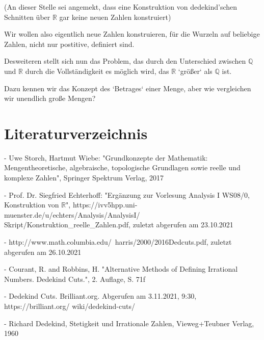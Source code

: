 \documentclass[12pt]{article}
\begin{document}
    (An dieser Stelle sei angemekt, dass eine Konstruktion von dedekind'schen Schnitten über $\mathbb{R}$ gar
    keine neuen Zahlen konstruiert)

    Wir wollen also eigentlich neue Zahlen konstruieren, für die Wurzeln auf beliebige Zahlen, nicht nur postitive,
    definiert sind.

    Desweiteren stellt sich nun das Problem, das durch den Unterschied zwischen $\mathbb{Q}$ und $\mathbb{R}$
    durch die Vollständigkeit es möglich wird, das $\mathbb{R}$ `größer` als $\mathbb{Q}$ ist.

    Dazu kennen wir das Konzept des `Betrages` einer Menge, aber wie vergleichen wir unendlich große Mengen?

    \newpage

    \section{Literaturverzeichnis}

    - Uwe Storch, Hartmut Wiebe: "Grundkonzepte der Mathematik: Mengentheoretische, algebraische, topologische Grundlagen
    sowie reelle und komplexe Zahlen", Springer Spektrum Verlag, 2017

    - Prof. Dr. Siegfried Echterhoff: "Ergänzung zur Vorlesung Analysis I WS08/0, Konstruktion von $\mathbb{R}$",
    https://ivv5hpp.uni-muenster.de/u/echters/Analysis/AnalysisI/ $\mspace{8mu}$ Skript/Konstruktion\_reelle\_Zahlen.pdf,
    zuletzt abgerufen am 23.10.2021

    - http://www.math.columbia.edu/~harris/2000/2016Dedcuts.pdf, zuletzt abgerufen am 26.10.2021

    - Courant, R. and Robbins, H. "Alternative Methods of Defining Irrational Numbers. Dedekind Cuts.", 2. Auflage,
    S. 71f

    - Dedekind Cuts. Brilliant.org. Abgerufen am 3.11.2021, 9:30, https://brilliant.org/ wiki/dedekind-cuts/

    - Richard Dedekind, Stetigkeit und Irrationale Zahlen, Vieweg+Teubner Verlag, 1960

    \newpage

\end{document}

